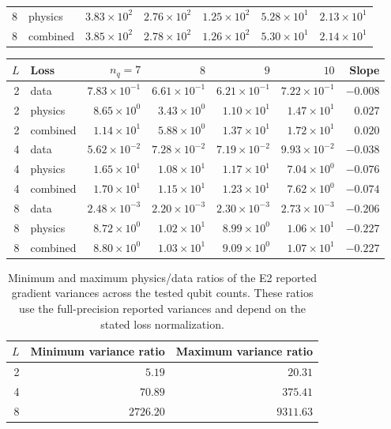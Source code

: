 \documentclass[11pt]{article}
\begin{document}
\begin{table}[htbp]
\begin{tabular}{rlrrrrr}
8 & physics & $3.83\times10^{2}$ & $2.76\times10^{2}$ & $1.25\times10^{2}$ & $5.28\times10^{1}$ & $2.13\times10^{1}$ \\
8 & combined & $3.85\times10^{2}$ & $2.78\times10^{2}$ & $1.26\times10^{2}$ & $5.30\times10^{1}$ & $2.14\times10^{1}$ \\
\bottomrule
\end{tabular}
\par\medskip
\begin{tabular}{rlrrrrr}
\toprule
$L$ & Loss & $n_q=7$ & $8$ & $9$ & $10$ & Slope \\
\midrule
2 & data & $7.83\times10^{-1}$ & $6.61\times10^{-1}$ & $6.21\times10^{-1}$ & $7.22\times10^{-1}$ & $-0.008$ \\
2 & physics & $8.65\times10^{0}$ & $3.43\times10^{0}$ & $1.10\times10^{1}$ & $1.47\times10^{1}$ & $0.027$ \\
2 & combined & $1.14\times10^{1}$ & $5.88\times10^{0}$ & $1.37\times10^{1}$ & $1.72\times10^{1}$ & $0.020$ \\
\midrule
4 & data & $5.62\times10^{-2}$ & $7.28\times10^{-2}$ & $7.19\times10^{-2}$ & $9.93\times10^{-2}$ & $-0.038$ \\
4 & physics & $1.65\times10^{1}$ & $1.08\times10^{1}$ & $1.17\times10^{1}$ & $7.04\times10^{0}$ & $-0.076$ \\
4 & combined & $1.70\times10^{1}$ & $1.15\times10^{1}$ & $1.23\times10^{1}$ & $7.62\times10^{0}$ & $-0.074$ \\
\midrule
8 & data & $2.48\times10^{-3}$ & $2.20\times10^{-3}$ & $2.30\times10^{-3}$ & $2.73\times10^{-3}$ & $-0.206$ \\
8 & physics & $8.72\times10^{0}$ & $1.02\times10^{1}$ & $8.99\times10^{0}$ & $1.06\times10^{1}$ & $-0.227$ \\
8 & combined & $8.80\times10^{0}$ & $1.03\times10^{1}$ & $9.09\times10^{0}$ & $1.07\times10^{1}$ & $-0.227$ \\
\bottomrule
\end{tabular}
\end{table}
\begin{table}[htbp]
\centering
\caption{Minimum and maximum physics/data ratios of the E2 reported gradient variances across the tested qubit counts. These ratios use the full-precision reported variances and depend on the stated loss normalization.}
\label{tab:e2ratios}
\small
\setlength{\tabcolsep}{3pt}
\begin{tabular}{rrr}
\toprule
$L$ & Minimum variance ratio & Maximum variance ratio \\
\midrule
2 & $5.19$ & $20.31$ \\
4 & $70.89$ & $375.41$ \\
8 & $2726.20$ & $9311.63$ \\
\bottomrule
\end{tabular}
\end{table}
\end{document}
